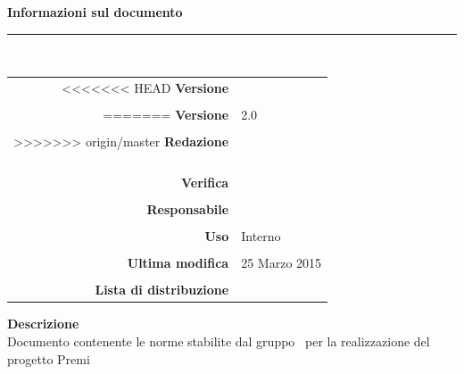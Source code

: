\begin{titlepage}
\begin{center}
	\vspace{1cm}
	\textbf{Informazioni sul documento}\\
    \rule{10cm}{.4pt} \\
	\begin{table}[h]
	\begin{center}
	\begin{tabular}{r | l}
<<<<<<< HEAD
		\textbf{Versione} & \versione \\ \\
=======
		\textbf{Versione} & 2.0 \\ \\
>>>>>>> origin/master
		\textbf{Redazione} & \CoMa \\
			& \ReAn \\ 
			& \DeEn \\ 
			& \CaMa \\ \\
		\textbf{Verifica} &\MaMo \\ \\
		\textbf{Responsabile} & \GoIs \\ \\
		\textbf{Uso} & Interno \\ \\
		\textbf{Ultima modifica} & 25 Marzo 2015 \\ \\
		\textbf{Lista di distribuzione} & \gruppo \\ 
	\end{tabular}
	\end{center}
	\end{table}
			\textbf{Descrizione} \\
			Documento contenente le norme stabilite dal gruppo \gruppo\ per la realizzazione del progetto Premi
	\end{center}
\end{titlepage}